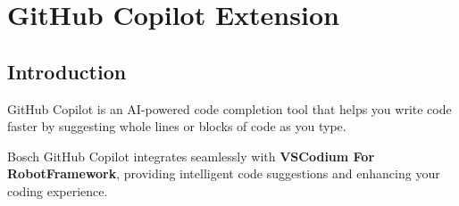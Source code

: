 %
%
%
\chapter{GitHub Copilot Extension}
\label{chap:copilot}

\section{Introduction}
GitHub Copilot is an AI-powered code completion tool that helps you write code
faster by suggesting whole lines or blocks of code as you type.

Bosch GitHub Copilot integrates seamlessly with
\textbf{VSCodium For RobotFramework}, providing intelligent code suggestions
and enhancing your coding experience.


